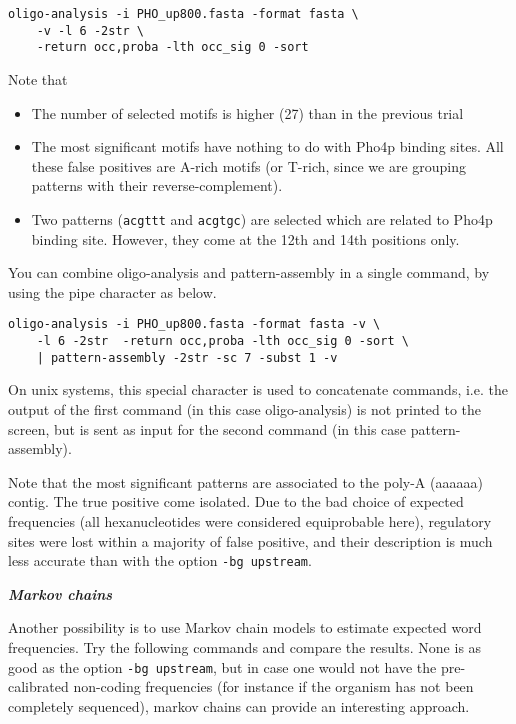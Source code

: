 \begin{verbatim} 
oligo-analysis -i PHO_up800.fasta -format fasta \ 
    -v -l 6 -2str \
    -return occ,proba -lth occ_sig 0 -sort 
\end{verbatim}

Note that
\begin{itemize} 
\item The number of selected motifs is higher (27) than in the previous trial
\item The most significant motifs have nothing to do with Pho4p binding
sites. All these false positives are A-rich motifs (or T-rich, since we
are grouping patterns with their reverse-complement).
\item Two patterns (\texttt{acgttt} and \texttt{acgtgc}) are selected
which are related to Pho4p binding site. However, they come at the
12th and 14th positions only.
\end{itemize}

You can combine oligo-analysis and pattern-assembly in a single
command, by using the pipe character as below.

\begin{verbatim}
oligo-analysis -i PHO_up800.fasta -format fasta -v \
    -l 6 -2str  -return occ,proba -lth occ_sig 0 -sort \
    | pattern-assembly -2str -sc 7 -subst 1 -v
\end{verbatim}

On unix systems, this special character is used to concatenate
commands, i.e. the output of the first command (in this case
oligo-analysis) is not printed to the screen, but is sent as input for
the second command (in this case pattern-assembly).

Note that the most significant patterns are associated to the poly-A
(aaaaaa) contig. The true positive come isolated. Due to the bad
choice of expected frequencies (all hexanucleotides were considered
equiprobable here), regulatory sites were lost within a majority of
false positive, and their description is much less accurate than with
the option \texttt{-bg upstream}.

\textit{\textbf{Markov chains}}

Another possibility is to use Markov chain models to estimate expected
word frequencies. Try the following commands and compare the
results. None is as good as the option \texttt{-bg upstream},
but in case one would not have the pre-calibrated non-coding
frequencies (for instance if the organism has not been completely
sequenced), markov chains can provide an interesting approach.


